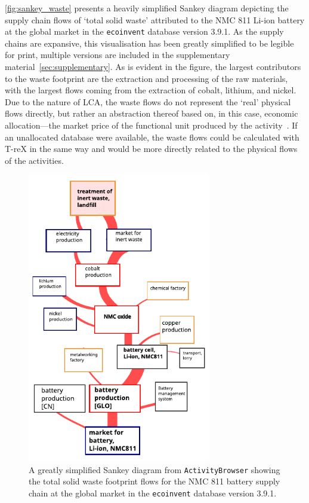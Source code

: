 \autoref{fig:sankey_waste} presents a heavily simplified Sankey diagram depicting the supply chain flows of `total solid waste' attributed to the NMC 811 Li-ion battery at the global market in the \texttt{ecoinvent} database version 3.9.1. As the supply chains are expansive, this visualisation has been greatly simplified to be legible for print, multiple versions are included in the supplementary material~\autoref{sec:supplementary}. As is evident in the figure, the largest contributors to the waste footprint are the extraction and processing of the raw materials, with the largest flows coming from the extraction of cobalt, lithium, and nickel. Due to the nature of LCA, the waste flows do not represent the `real' physical flows directly, but rather an abstraction thereof based on, in this case, economic allocation---the market price of the functional unit produced by the activity~\citep{guinee2004economicallocation}. If an unallocated database were available, the waste flows could be calculated with T-reX in the same way and would be more directly related to the physical flows of the activities.

\begin{figure}[H]
    \centering
    \includegraphics[width=8cm]{figures/T-reX_NMC811_WasteTotalSolid.pdf}
    \caption{A greatly simplified Sankey diagram from \texttt{ActivityBrowser} showing the total solid waste footprint flows for the NMC 811 battery supply chain at the global market in the \texttt{ecoinvent} database version 3.9.1.}\label{fig:sankey_waste}
\end{figure}

